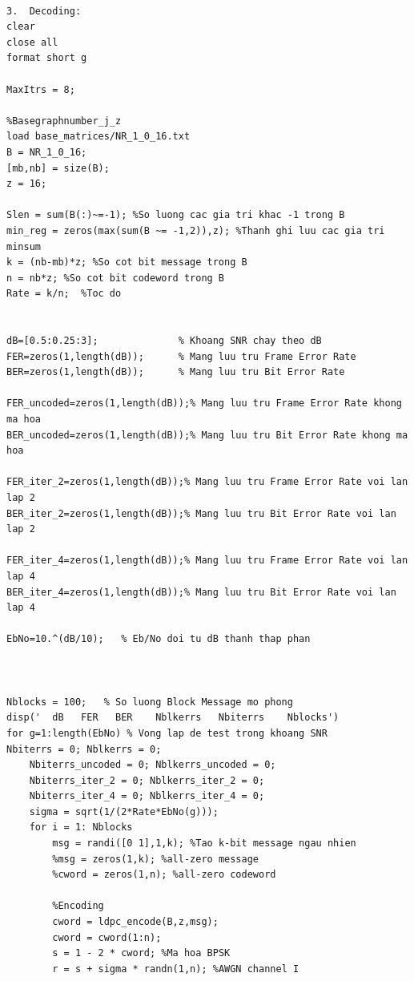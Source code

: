 \documentclass{article}
\begin{document}
\begin{tcolorbox}
\begin{verbatim}

3.	Decoding:
clear
close all
format short g
 
MaxItrs = 8;
 
%Basegraphnumber_j_z
load base_matrices/NR_1_0_16.txt
B = NR_1_0_16;
[mb,nb] = size(B);
z = 16;
 
Slen = sum(B(:)~=-1); %So luong cac gia tri khac -1 trong B
min_reg = zeros(max(sum(B ~= -1,2)),z); %Thanh ghi luu cac gia tri minsum
k = (nb-mb)*z; %So cot bit message trong B
n = nb*z; %So cot bit codeword trong B
Rate = k/n;  %Toc do
 
 
dB=[0.5:0.25:3];              % Khoang SNR chay theo dB
FER=zeros(1,length(dB));      % Mang luu tru Frame Error Rate
BER=zeros(1,length(dB));      % Mang luu tru Bit Error Rate
 
FER_uncoded=zeros(1,length(dB));% Mang luu tru Frame Error Rate khong ma hoa
BER_uncoded=zeros(1,length(dB));% Mang luu tru Bit Error Rate khong ma hoa
 
FER_iter_2=zeros(1,length(dB));% Mang luu tru Frame Error Rate voi lan lap 2
BER_iter_2=zeros(1,length(dB));% Mang luu tru Bit Error Rate voi lan lap 2
 
FER_iter_4=zeros(1,length(dB));% Mang luu tru Frame Error Rate voi lan lap 4
BER_iter_4=zeros(1,length(dB));% Mang luu tru Bit Error Rate voi lan lap 4
 
EbNo=10.^(dB/10);   % Eb/No doi tu dB thanh thap phan
 
 
 
Nblocks = 100;   % So luong Block Message mo phong
disp('  dB   FER   BER    Nblkerrs   Nbiterrs    Nblocks')
for g=1:length(EbNo) % Vong lap de test trong khoang SNR
Nbiterrs = 0; Nblkerrs = 0; 
    Nbiterrs_uncoded = 0; Nblkerrs_uncoded = 0; 
    Nbiterrs_iter_2 = 0; Nblkerrs_iter_2 = 0; 
    Nbiterrs_iter_4 = 0; Nblkerrs_iter_4 = 0; 
    sigma = sqrt(1/(2*Rate*EbNo(g)));
    for i = 1: Nblocks
        msg = randi([0 1],1,k); %Tao k-bit message ngau nhien
        %msg = zeros(1,k); %all-zero message
        %cword = zeros(1,n); %all-zero codeword
        
        %Encoding 
        cword = ldpc_encode(B,z,msg);
        cword = cword(1:n);  
        s = 1 - 2 * cword; %Ma hoa BPSK
        r = s + sigma * randn(1,n); %AWGN channel I
\end{verbatim}
\end{tcolorbox}
\end{document}
